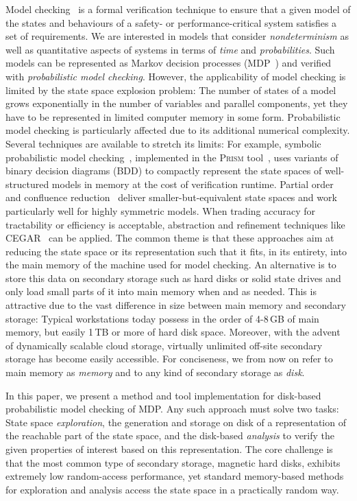 \documentclass{llncs}
\newcommand{\prism}{\textsc{Prism}\xspace}
\begin{document}
Model checking~\cite{CGP99} is a formal verification technique to ensure that a given model of the states and behaviours of a safety- or performance-critical system satisfies a set of requirements.
We are interested in models that consider \emph{nondeterminism} as well as quantitative aspects of systems in terms of \emph{time} and \emph{probabilities}.
Such models can be represented as Markov decision processes (MDP~\cite{Put94}) and verified with \emph{probabilistic model checking}.
However, the applicability of model checking is limited by the state space explosion problem:
The number of states of a model grows exponentially in the number of variables and parallel components, yet they have to be represented in limited computer memory in some form.
Probabilistic model checking is particularly affected due to its additional numerical complexity.
Several techniques are available to stretch its limits:
For example, symbolic probabilistic model checking~\cite{AKNPS00}, implemented in the \prism tool~\cite{KNP11}, uses variants of binary decision diagrams (BDD) to compactly represent the state spaces of well-structured models in memory at the cost of verification runtime.
Partial order~\cite{BDG06} and confluence reduction~\cite{TSP11} deliver smaller-but-equivalent state spaces and work particularly well for highly symmetric models.
When trading accuracy for tractability or efficiency is acceptable, abstraction and refinement techniques like CEGAR~\cite{HWZ08} can be applied.
The common theme is that these approaches aim at reducing the state space or its representation such that it fits, in its entirety, into the main memory of the machine used for model checking.
An alternative is to store this data on secondary storage such as hard disks or solid state drives and only load small parts of it into main memory when and as needed.
This is attractive due to the vast difference in size between main memory and secondary storage:
Typical workstations today possess in the order of 4-8\,GB of main memory, but easily 1\,TB or more of hard disk space.
Moreover, with the advent of dynamically scalable cloud storage, virtually unlimited off-site secondary storage has become easily accessible.
For conciseness, we from now on refer to main memory as \emph{memory} and to any kind of secondary storage as \emph{disk}.

In this paper, we present a method and tool implementation for disk-based probabilistic model checking of MDP.
Any such approach  must solve two tasks:
State space \emph{exploration}, the generation and storage on disk of a representation of the reachable part of the state space, and the disk-based \emph{analysis} to verify  the given properties of interest based on this representation.
The core challenge is that the most common type of secondary storage, magnetic hard disks, exhibits extremely low random-access performance, yet standard memory-based methods for exploration and analysis access the state space in a practically random way.
\end{document}
